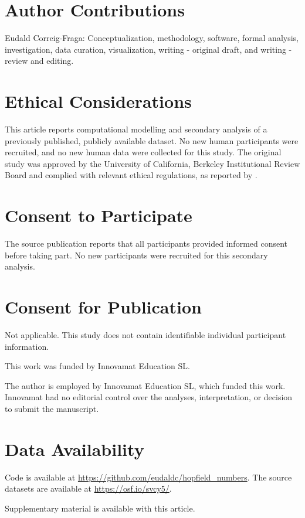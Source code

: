\documentclass[Afour,sageh,times]{sagej}
\begin{document}
\section*{Author Contributions}
Eudald Correig-Fraga: Conceptualization, methodology, software, formal analysis, investigation, data curation, visualization, writing - original draft, and writing - review and editing.

\section*{Ethical Considerations}
This article reports computational modelling and secondary analysis of a previously published, publicly available dataset. No new human participants were recruited, and no new human data were collected for this study. The original study was approved by the University of California, Berkeley Institutional Review Board and complied with relevant ethical regulations, as reported by \citet{cheyette_unified_2020}.

\section*{Consent to Participate}
The source publication reports that all participants provided informed consent before taking part. No new participants were recruited for this secondary analysis.

\section*{Consent for Publication}
Not applicable. This study does not contain identifiable individual participant information.

\begin{funding}
This work was funded by Innovamat Education SL.
\end{funding}

\begin{dci}
The author is employed by Innovamat Education SL, which funded this work. Innovamat had no editorial control over the analyses, interpretation, or decision to submit the manuscript.
\end{dci}

\section*{Data Availability}
Code is available at \url{https://github.com/eudaldc/hopfield_numbers}. The source datasets are available at \url{https://osf.io/svcy5/}.

\begin{sm}
Supplementary material is available with this article.
\end{sm}



\end{document}
